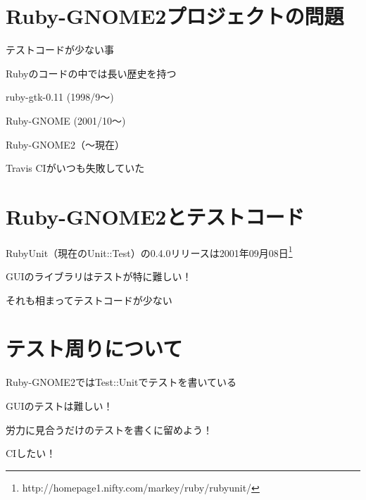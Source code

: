 \section{Ruby-GNOME2プロジェクトの問題}

\begin{frame}
\begin{itemize}
{\Large
\item{} テストコードが少ない事
\item{} Rubyのコードの中では長い歴史を持つ

ruby-gtk-0.11 (1998/9〜)

Ruby-GNOME (2001/10〜)

Ruby-GNOME2（〜現在）
}
{\huge
\item{} Travis CIがいつも失敗していた
}
\end{itemize}
\end{frame}

\section{Ruby-GNOME2とテストコード}

\begin{frame}
\begin{itemize}
{\Large
\item RubyUnit（現在のUnit::Test）の0.4.0リリースは2001年09月08日\footnote{http://homepage1.nifty.com/markey/ruby/rubyunit/}
\item GUIのライブラリはテストが特に難しい！
\item それも相まってテストコードが少ない
}
\end{itemize}
\end{frame}

\section{テスト周りについて}
\begin{frame}
\begin{itemize}
{\huge
\item{} Ruby-GNOME2ではTest::Unitでテストを書いている
\item{} GUIのテストは難しい！
\item{} 労力に見合うだけのテストを書くに留めよう！
\item{} CIしたい！
}
\end{itemize}
\end{frame}
